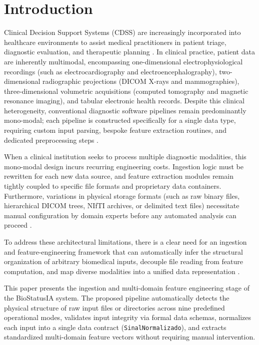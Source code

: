 \section{Introduction}
\label{sec:introducao}

Clinical Decision Support Systems (CDSS) are increasingly incorporated into healthcare environments to assist medical practitioners in patient triage, diagnostic evaluation, and therapeutic planning \cite{albuquerque2020iomt, reboucas2019landmark, holanda2021multimodal}. In clinical practice, patient data are inherently multimodal, encompassing one-dimensional electrophysiological recordings (such as electrocardiography and electroencephalography), two-dimensional radiographic projections (DICOM X-rays and mammographies), three-dimensional volumetric acquisitions (computed tomography and magnetic resonance imaging), and tabular electronic health records. Despite this clinical heterogeneity, conventional diagnostic software pipelines remain predominantly mono-modal; each pipeline is constructed specifically for a single data type, requiring custom input parsing, bespoke feature extraction routines, and dedicated preprocessing steps \cite{polyzotis2018data, holanda2021multimodal}.

When a clinical institution seeks to process multiple diagnostic modalities, this mono-modal design incurs recurring engineering costs. Ingestion logic must be rewritten for each new data source, and feature extraction modules remain tightly coupled to specific file formats and proprietary data containers. Furthermore, variations in physical storage formats (such as raw binary files, hierarchical DICOM trees, NIfTI archives, or delimited text files) necessitate manual configuration by domain experts before any automated analysis can proceed \cite{albuquerque2021covid, albuquerque2018ecg}.

To address these architectural limitations, there is a clear need for an ingestion and feature-engineering framework that can automatically infer the structural organization of arbitrary biomedical inputs, decouple file reading from feature computation, and map diverse modalities into a unified data representation \cite{polyzotis2018data}.

This paper presents the ingestion and multi-domain feature engineering stage of the BioStatusIA system. The proposed pipeline automatically detects the physical structure of raw input files or directories across nine predefined operational modes, validates input integrity via formal data schemas, normalizes each input into a single data contract (\texttt{SinalNormalizado}), and extracts standardized multi-domain feature vectors without requiring manual intervention.

